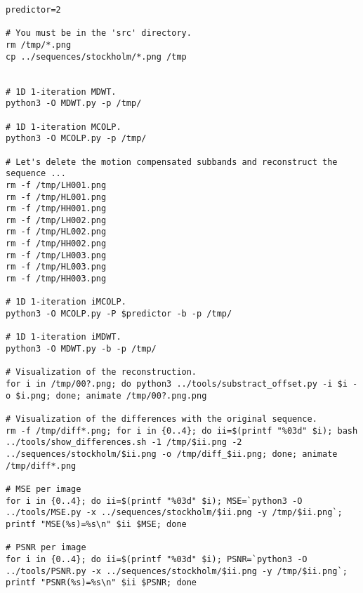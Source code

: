 \begin{verbatim}
predictor=2

# You must be in the 'src' directory.
rm /tmp/*.png
cp ../sequences/stockholm/*.png /tmp


# 1D 1-iteration MDWT.
python3 -O MDWT.py -p /tmp/

# 1D 1-iteration MCOLP.
python3 -O MCOLP.py -p /tmp/

# Let's delete the motion compensated subbands and reconstruct the sequence ...
rm -f /tmp/LH001.png
rm -f /tmp/HL001.png
rm -f /tmp/HH001.png
rm -f /tmp/LH002.png
rm -f /tmp/HL002.png
rm -f /tmp/HH002.png
rm -f /tmp/LH003.png
rm -f /tmp/HL003.png
rm -f /tmp/HH003.png

# 1D 1-iteration iMCOLP.
python3 -O MCOLP.py -P $predictor -b -p /tmp/

# 1D 1-iteration iMDWT.
python3 -O MDWT.py -b -p /tmp/

# Visualization of the reconstruction.
for i in /tmp/00?.png; do python3 ../tools/substract_offset.py -i $i -o $i.png; done; animate /tmp/00?.png.png

# Visualization of the differences with the original sequence.
rm -f /tmp/diff*.png; for i in {0..4}; do ii=$(printf "%03d" $i); bash ../tools/show_differences.sh -1 /tmp/$ii.png -2 ../sequences/stockholm/$ii.png -o /tmp/diff_$ii.png; done; animate /tmp/diff*.png

# MSE per image
for i in {0..4}; do ii=$(printf "%03d" $i); MSE=`python3 -O ../tools/MSE.py -x ../sequences/stockholm/$ii.png -y /tmp/$ii.png`; printf "MSE(%s)=%s\n" $ii $MSE; done

# PSNR per image
for i in {0..4}; do ii=$(printf "%03d" $i); PSNR=`python3 -O ../tools/PSNR.py -x ../sequences/stockholm/$ii.png -y /tmp/$ii.png`; printf "PSNR(%s)=%s\n" $ii $PSNR; done
\end{verbatim}


